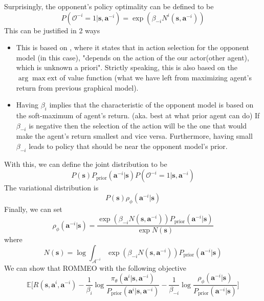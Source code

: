 Surprisingly, the opponent's policy optimality can be defined to be 
\begin{equation}
    P(\mathcal{O}^{-i} = 1 | \boldsymbol{s}, \boldsymbol{a}^{-i}) = \exp(\beta_{-i} N^{i}(\boldsymbol{s}, \boldsymbol{a}^{-i}))
\end{equation}
This can be justified in 2 ways 
\begin{itemize}
    \item This is based on \cite{grau2018balancing}, where it states that in action selection for the opponent model (in this case), "depends on the action of the our actor(other agent), which is unknown a priori". Strictly speaking, this is also based on the $\arg\max\text{ext}$ of value function (what we have left from maximizing agent's return from previous graphical model). 
    \item Having $\beta_i$ implies that the characteristic of the opponent model is based on the soft-maximum of agent's return. (aka. best at what prior agent can do) If $\beta_{-i}$ is negative then the selection of the action will be the one that would make the agent's return smallest and vice versa. Furthermore, having small $\beta_{-i}$ leads to policy that should be near the opponent model's prior.
\end{itemize}
With this, we can define the joint distribution to be 
\begin{equation}
    P(\boldsymbol{s}) P_{\text{prior}}(\boldsymbol{a}^{-i} | \boldsymbol{s}) P(\mathcal{O}^{-i} = 1 | \boldsymbol{s}, \boldsymbol{a}^{-i})
\end{equation}
The variational distribution is 
\begin{equation}
    P(\boldsymbol{s}) \rho_{\phi}(\boldsymbol{a}^{-i} | \boldsymbol{s})
\end{equation}
Finally, we can set 
\begin{equation}
    \rho_{\phi}(\boldsymbol{a}^{-i} | \boldsymbol{s}) = \frac{\exp(\beta_{-i} N(\boldsymbol{s}, \boldsymbol{a}^{-i})) P_{\text{prior}}(\boldsymbol{a}^{-i} | \boldsymbol{s})}{\exp N(\boldsymbol{s})}
\end{equation}
where 
\begin{equation}
    N(\boldsymbol{s}) = \log \int_{\mathcal{A}^{-i}} \exp(\beta_{-i} N(\boldsymbol{s}, \boldsymbol{a}^{-i})) P_{\text{prior}}(\boldsymbol{a}^{-i} | \boldsymbol{s})
\end{equation}
We can show that ROMMEO with the following objective 
\begin{equation}
    \mathbb{E}\Bigg[ R(\boldsymbol{s}, \boldsymbol{a}^i, \boldsymbol{a}^{-i}) - \frac{1}{\beta_i} \log \frac{\pi_{\theta}(\boldsymbol{a}^i | \boldsymbol{s}, \boldsymbol{a}^{-i})}{P_{\text{prior}}(\boldsymbol{a}^i | \boldsymbol{s}, \boldsymbol{a}^{-i})} - \frac{1}{\beta_{-i}} \log \frac{\rho_{\phi}(\boldsymbol{a}^{-i} | \boldsymbol{s})}{P_{\text{prior}}(\boldsymbol{a}^{-i} | \boldsymbol{s})}  \Bigg]
\end{equation}
